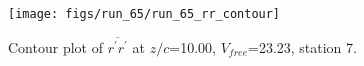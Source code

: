 \begin{figure}[H]
\centering
\texttt{[image: figs/run\_65/run\_65\_rr\_contour]}
\caption{Contour plot of $\overline{r^\prime r^\prime}$ at $z/c$=10.00, $V_{free}$=23.23, station 7.}
\end{figure}


